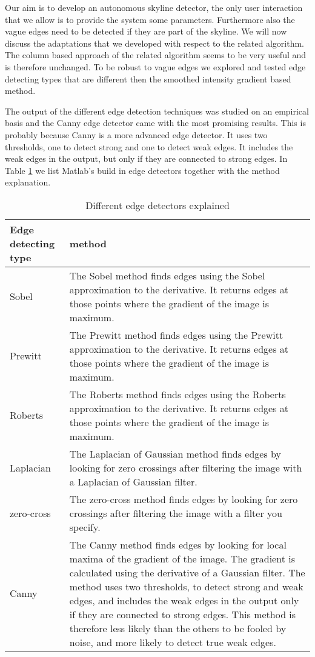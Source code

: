 Our aim is to develop an autonomous skyline detector, the only user interaction
that we allow is to provide the system some parameters. Furthermore also the vague
edges need to be detected if they are part of the skyline. We will now discuss
the adaptations that we developed with respect to the related algorithm.\\

The column based approach of the related algorithm seems to be very useful and is
therefore unchanged.  To be robust to vague edges we explored and tested
edge detecting types that are different then the smoothed intensity gradient
based method.


The output of the different edge detection techniques was studied on an empirical
basis and the Canny edge detector \cite{Canny} came with the most promising results. This is
probably because Canny is a more advanced edge detector.  It uses two
thresholds, one to detect strong and one to detect weak edges. It includes the weak edges in the
output, but only if they are connected to strong edges. In Table \ref{tab:edge} %
we list Matlab's build in edge detectors together with the method explanation.

\begin{table}[ht]
\caption{Different edge detectors explained}
\label{tab:edge}
\begin{tabular}{|l|p{10cm}|}
	\hline
	Edge detecting type		& method\\
	\hline
	\hline
	Sobel					& The Sobel method finds edges using the Sobel
	approximation to the derivative. It returns edges at those points where the
	gradient of the image is maximum.\\
	\hline
	Prewitt					& The Prewitt method finds edges using the Prewitt
	approximation to the derivative. It returns edges at those points where the
	gradient of the image is maximum.\\
	\hline
	Roberts					& The Roberts method finds edges using the Roberts
	approximation to the derivative. It returns edges at those points where the
	gradient of the image is maximum.\\
	\hline
	Laplacian				& The Laplacian of Gaussian method finds edges by
	looking for zero crossings after filtering the image with a Laplacian of Gaussian
	filter.\\
	\hline
	zero-cross				& The zero-cross method finds edges by looking for zero
	crossings after filtering the image with a filter you specify.\\
	\hline
	Canny					& The Canny method finds edges by looking for local
	maxima of the gradient of the image. The gradient is calculated using the derivative of
	a Gaussian filter. The method uses two thresholds, to detect strong and weak
	edges, and includes the weak edges in the output only if they are connected to
	strong edges. This method is therefore less likely than the others to be fooled
	by noise, and more likely to detect true weak edges.\\
	\hline
\end{tabular}
\end{table}


